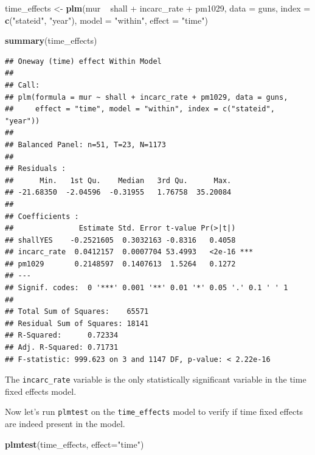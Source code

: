\documentclass[]{article}
\newenvironment{Shaded}{\begin{snugshade}}{\end{snugshade}}
\newcommand{\KeywordTok}[1]{\textcolor[rgb]{0.13,0.29,0.53}{\textbf{{#1}}}}
\newcommand{\DataTypeTok}[1]{\textcolor[rgb]{0.13,0.29,0.53}{{#1}}}
\newcommand{\StringTok}[1]{\textcolor[rgb]{0.31,0.60,0.02}{{#1}}}
\newcommand{\NormalTok}[1]{{#1}}
\theoremstyle{definition}
\theoremstyle{definition}
\theoremstyle{remark}
\begin{document}
\begin{Shaded}
\begin{Highlighting}[]
\NormalTok{time_effects <-}\StringTok{ }\KeywordTok{plm}\NormalTok{(mur ~}\StringTok{ }\NormalTok{shall +}\StringTok{ }\NormalTok{incarc_rate +}\StringTok{ }\NormalTok{pm1029, }
                    \DataTypeTok{data =} \NormalTok{guns, }
                    \DataTypeTok{index =} \KeywordTok{c}\NormalTok{(}\StringTok{"stateid"}\NormalTok{, }\StringTok{"year"}\NormalTok{), }
                    \DataTypeTok{model =} \StringTok{"within"}\NormalTok{, }
                    \DataTypeTok{effect =} \StringTok{"time"}\NormalTok{)}

\KeywordTok{summary}\NormalTok{(time_effects)}
\end{Highlighting}
\end{Shaded}

\begin{verbatim}
## Oneway (time) effect Within Model
## 
## Call:
## plm(formula = mur ~ shall + incarc_rate + pm1029, data = guns, 
##     effect = "time", model = "within", index = c("stateid", "year"))
## 
## Balanced Panel: n=51, T=23, N=1173
## 
## Residuals :
##      Min.   1st Qu.    Median   3rd Qu.      Max. 
## -21.68350  -2.04596  -0.31955   1.76758  35.20084 
## 
## Coefficients :
##               Estimate Std. Error t-value Pr(>|t|)    
## shallYES    -0.2521605  0.3032163 -0.8316   0.4058    
## incarc_rate  0.0412157  0.0007704 53.4993   <2e-16 ***
## pm1029       0.2148597  0.1407613  1.5264   0.1272    
## ---
## Signif. codes:  0 '***' 0.001 '**' 0.01 '*' 0.05 '.' 0.1 ' ' 1
## 
## Total Sum of Squares:    65571
## Residual Sum of Squares: 18141
## R-Squared:      0.72334
## Adj. R-Squared: 0.71731
## F-statistic: 999.623 on 3 and 1147 DF, p-value: < 2.22e-16
\end{verbatim}

The \texttt{incarc\_rate} variable is the only statistically significant
variable in the time fixed effects model.

Now let's run \texttt{plmtest} on the \texttt{time\_effects} model to
verify if time fixed effects are indeed present in the model.

\begin{Shaded}
\begin{Highlighting}[]
\KeywordTok{plmtest}\NormalTok{(time_effects, }\DataTypeTok{effect=}\StringTok{"time"}\NormalTok{)}
\end{Highlighting}
\end{Shaded}
\end{document}
